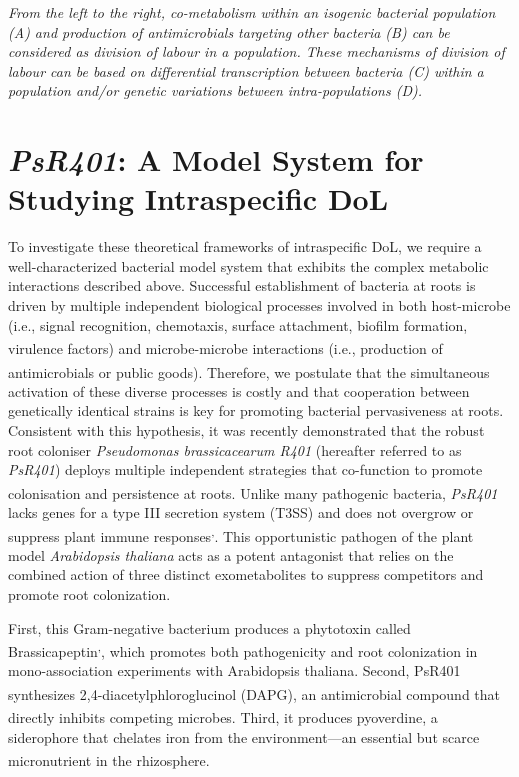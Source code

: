 \documentclass[
  11pt,
  a4paper,
]{report}
\begin{document}
\emph{From the left to the right, co-metabolism within an isogenic
bacterial population (A) and production of antimicrobials targeting
other bacteria (B) can be considered as division of labour in a
population. These mechanisms of division of labour can be based on
differential transcription between bacteria (C) within a population
and/or genetic variations between intra-populations (D).}

\section{\texorpdfstring{\emph{PsR401}: A Model System for Studying
Intraspecific
DoL}{PsR401: A Model System for Studying Intraspecific DoL}}\label{psr401-a-model-system-for-studying-intraspecific-dol}

To investigate these theoretical frameworks of intraspecific DoL, we
require a well-characterized bacterial model system that exhibits the
complex metabolic interactions described above. Successful establishment
of bacteria at roots is driven by multiple independent biological
processes involved in both host-microbe (i.e., signal recognition,
chemotaxis, surface attachment, biofilm formation, virulence
factors)\textsuperscript{} and
microbe-microbe interactions (i.e., production of antimicrobials or
public goods)\textsuperscript{}.
Therefore, we postulate that the simultaneous activation of these
diverse processes is costly and that cooperation between genetically
identical strains is key for promoting bacterial pervasiveness at roots.
Consistent with this hypothesis, it was recently demonstrated that the
robust root coloniser \emph{Pseudomonas brassicacearum R401} (hereafter
referred to as \emph{PsR401}) deploys multiple independent strategies
that co-function to promote colonisation and persistence at
roots\textsuperscript{}. Unlike many
pathogenic bacteria, \emph{PsR401} lacks genes for a type III secretion
system (T3SS) and does not overgrow or suppress plant immune
responses\textsuperscript{,}.
This opportunistic
pathogen\textsuperscript{} of the plant
model \emph{Arabidopsis thaliana} acts as a potent antagonist that
relies on the combined action of three distinct exometabolites to
suppress competitors and promote root colonization.

First, this Gram-negative bacterium produces a phytotoxin called
Brassicapeptin\textsuperscript{,},
which promotes both pathogenicity and root colonization in
mono-association experiments with Arabidopsis thaliana. Second, PsR401
synthesizes 2,4-diacetylphloroglucinol
(DAPG)\textsuperscript{}, an antimicrobial
compound that directly inhibits competing microbes. Third, it produces
pyoverdine\textsuperscript{}, a siderophore
that chelates iron from the environment---an essential but scarce
micronutrient in the
rhizosphere\textsuperscript{}.
\end{document}
